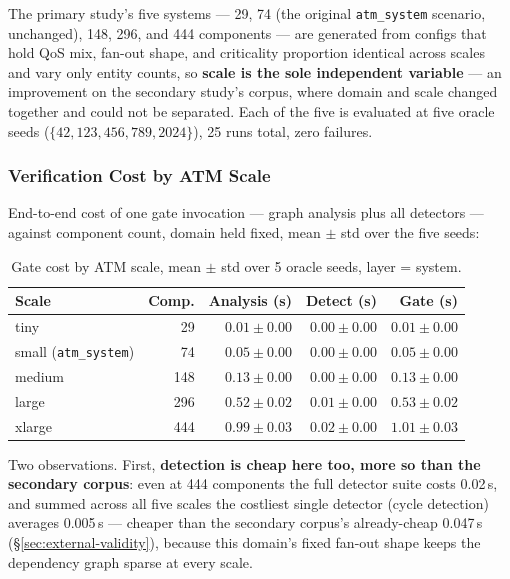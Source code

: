 \documentclass[sigconf,9pt]{acmart}
\begin{document}
The primary study's five systems --- 29, 74 (the original \texttt{atm\_system} scenario, unchanged),
148, 296, and 444 components --- are generated from configs that hold QoS mix, fan-out shape, and
criticality proportion identical across scales and vary only entity counts, so \textbf{scale is
the sole independent variable} --- an improvement on the secondary study's corpus, where domain and
scale changed together and could not be separated. Each of the five is evaluated at five oracle
seeds ($\{42, 123, 456, 789, 2024\}$), 25 runs total, zero failures.

\subsubsection{Verification Cost by ATM Scale}
\label{sec:cost-atm}

End-to-end cost of one gate invocation --- graph analysis plus all detectors --- against component
count, domain held fixed, mean $\pm$ std over the five seeds:

\begin{table}[t]
\caption{Gate cost by ATM scale, mean $\pm$ std over 5 oracle seeds, layer = system.}
\label{tab:cost}
\footnotesize
\begin{tabular}{@{}lrrrr@{}}
\toprule
\textbf{Scale} & \textbf{Comp.} & \textbf{Analysis (s)} & \textbf{Detect (s)} & \textbf{Gate (s)} \\
\midrule
tiny             & 29  & $0.01\pm0.00$ & $0.00\pm0.00$ & $0.01\pm0.00$ \\
small (\texttt{atm\_system}) & 74  & $0.05\pm0.00$ & $0.00\pm0.00$ & $0.05\pm0.00$ \\
medium           & 148 & $0.13\pm0.00$ & $0.00\pm0.00$ & $0.13\pm0.00$ \\
large            & 296 & $0.52\pm0.02$ & $0.01\pm0.00$ & $0.53\pm0.02$ \\
xlarge           & 444 & $0.99\pm0.03$ & $0.02\pm0.00$ & $1.01\pm0.03$ \\
\bottomrule
\end{tabular}
\end{table}

Two observations. First, \textbf{detection is cheap here too, more so than the secondary corpus}:
even at 444 components the full detector suite costs 0.02\,s, and summed across all five scales the
costliest single detector (cycle detection) averages 0.005\,s --- cheaper than the secondary
corpus's already-cheap 0.047\,s (\S\ref{sec:external-validity}), because this domain's fixed
fan-out shape keeps the dependency graph sparse at every scale.
\end{document}
